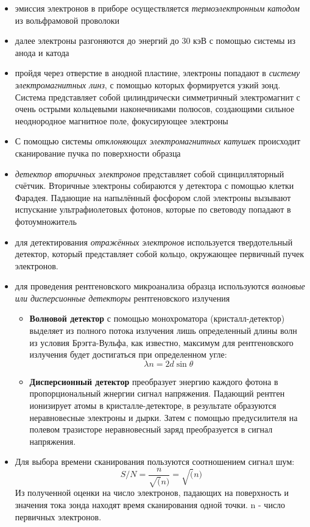 \documentclass[a4paper]{article}
\begin{document}
\begin{itemize}
    \item эмиссия электронов в приборе осуществляется \textit{термоэлектронным катодом} из вольфрамовой проволоки
    \item далее электроны разгоняются до энергий до 30 кэВ с помощью системы из анода и катода
    \item пройдя через отверстие в анодной пластине, электроны попадают в \textit{систему электромагнитных линз}, с помощью которых формируется узкий зонд. Система 
    представляет собой цилиндрически симметричный электромагнит с очень острыми кольцевыми наконечниками полюсов, создающими сильное неоднородное магнитное поле, 
    фокусирующее электроны
    \item С помощью системы \textit{отклоняющих электромагнитных катушек} происходит сканирование пучка по поверхности образца
    \item \textit{детектор вторичных электронов} представляет собой сцинцилляторный счётчик. Вторичные электроны собираются у детектора с помощью клетки Фарадея. 
    Падающие на напылённый фосфором слой электроны вызывают испускание ультрафиолетовых фотонов, которые по световоду попадают в фотоумножитель
    \item для детектирования \textit{отражённых электронов} используется твердотельный детектор, который представляет собой кольцо, окружающее первичный пучек электронов.
    \item для проведения рентгеновского микроанализа образца используются \textit{волновые или дисперсионные детекторы} рентгеновского излучения

    \begin{itemize}
        \item \textbf{Волновой детектор} с помощью монохроматора (кристалл-детектор) выделяет из полного потока излучения лишь определенный длины волн из условия Брэгга-Вульфа, как известно,
        максимум для рентгеновского излучения будет достигаться при определенном угле:
        $$\lambda n = 2 d \sin \theta$$

        \item \textbf{Дисперсионный детектор} преобразует энергию каждого фотона в пропорциональный жнергии сигнал напряжения. Падающий рентген ионизирует атомы в кристалле-детекторе,
        в результате образуются неравновесные электроны и дырки. Затем с помощью предусилителя на полевом тразисторе неравновесный заряд преобразуется в сигнал напряжения. 
    \end{itemize}

    \item Для выбора времени сканирования пользуются соотношением сигнал шум:
    $$S/N = \frac{n}{\sqrt(n)} = \sqrt(n)$$
    Из полученной оценки на число электронов, падающих на поверхность и значения тока зонда находят время сканирования одной точки. n - число первичных электронов. 

\end{itemize}
\end{document}
